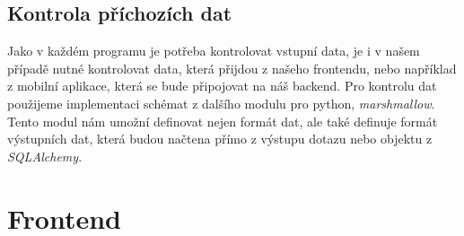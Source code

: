 \clearpage

\subsection{Kontrola příchozích dat}

Jako v každém programu je potřeba kontrolovat vstupní data, je i v našem případě nutné kontrolovat data, která přijdou z našeho frontendu, nebo například z mobilní aplikace,
která se bude připojovat na náš backend. Pro kontrolu dat použijeme implementaci schémat z dalšího modulu pro python, \textit{marshmallow}. Tento modul nám umožní definovat
nejen formát dat, ale také definuje formát výstupních dat, která budou načtena přímo z výstupu dotazu nebo objektu z \textit{SQLAlchemy}.

\section{Frontend}